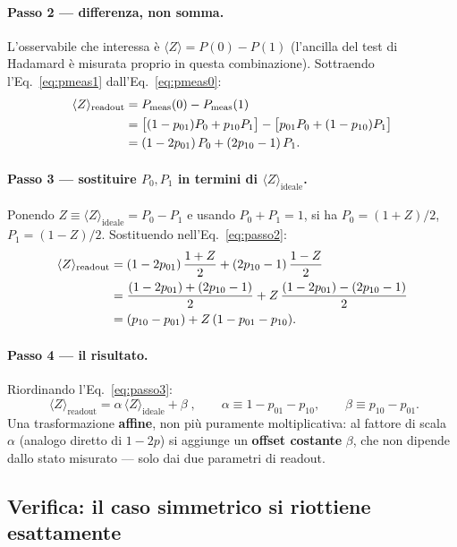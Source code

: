 \documentclass[11pt,a4paper]{article}
\begin{document}
\paragraph{Passo 2 --- differenza, non somma.} L'osservabile che interessa
è $\langle Z\rangle = P(0)-P(1)$ (l'ancilla del test di Hadamard è
misurata proprio in questa combinazione). Sottraendo
l'Eq.~\eqref{eq:pmeas1} dall'Eq.~\eqref{eq:pmeas0}:
\begin{align}
\langle Z\rangle_\text{readout} &= P_\text{meas}(0)-P_\text{meas}(1) \notag\\
&= \big[(1-p_{01})P_0+p_{10}P_1\big] - \big[p_{01}P_0+(1-p_{10})P_1\big] \notag\\
&= (1-2p_{01})\,P_0 + (2p_{10}-1)\,P_1.
\label{eq:passo2}
\end{align}

\paragraph{Passo 3 --- sostituire $P_0,P_1$ in termini di $\langle Z\rangle_\text{ideale}$.}
Ponendo $Z\equiv\langle Z\rangle_\text{ideale}=P_0-P_1$ e usando
$P_0+P_1=1$, si ha $P_0=(1+Z)/2$, $P_1=(1-Z)/2$. Sostituendo
nell'Eq.~\eqref{eq:passo2}:
\begin{align}
\langle Z\rangle_\text{readout}
&= (1-2p_{01})\,\frac{1+Z}{2} + (2p_{10}-1)\,\frac{1-Z}{2} \notag\\
&= \frac{(1-2p_{01})+(2p_{10}-1)}{2} + Z\,\frac{(1-2p_{01})-(2p_{10}-1)}{2} \notag\\
&= (p_{10}-p_{01}) + Z\,(1-p_{01}-p_{10}).
\label{eq:passo3}
\end{align}

\paragraph{Passo 4 --- il risultato.} Riordinando l'Eq.~\eqref{eq:passo3}:
\begin{equation}
\boxed{\;\langle Z\rangle_\text{readout} = \alpha\,\langle Z\rangle_\text{ideale} + \beta\;},
\qquad
\alpha \equiv 1-p_{01}-p_{10}, \qquad \beta \equiv p_{10}-p_{01}.
\label{eq:formula-generale}
\end{equation}
Una trasformazione \textbf{affine}, non più puramente moltiplicativa: al
fattore di scala $\alpha$ (analogo diretto di $1-2p$) si aggiunge un
\textbf{offset costante} $\beta$, che non dipende dallo stato misurato ---
solo dai due parametri di readout.

\subsection{Verifica: il caso simmetrico si riottiene esattamente}
\end{document}
